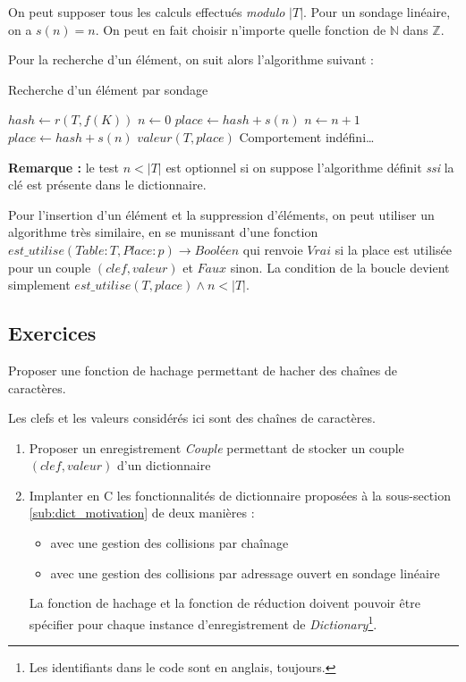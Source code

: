 \documentclass[../../../main.tex]{subfiles}
\begin{document}
On peut supposer tous les calculs effectués \textit{modulo} $|T|$. Pour un sondage linéaire, on a $s(n) = n$. On peut en fait choisir n'importe quelle fonction de $\mathbb{N}$ dans $\mathbb{Z}$.

Pour la recherche d'un élément, on suit alors l'algorithme suivant :\newline

\begin{algorithm}
\caption{Recherche d'un élément par sondage}\label{alg:dict_sondage}
$hash \leftarrow r(T, f(K))$\;
$n \leftarrow 0$\;
$place \leftarrow hash + s(n)$\;
 {
	$n\leftarrow n + 1$\;
	$place\leftarrow hash + s(n)$\;
}
 {
	\Return $valeur(T, place)$\;
} {
	Comportement indéfini\dots {}
}
\end{algorithm}

\textbf{Remarque :} le test $n < |T|$ est optionnel si on suppose l'algorithme définit \textit{ssi} la clé est présente dans le dictionnaire.

Pour l'insertion d'un élément et la suppression d'éléments, on peut utiliser un algorithme très similaire, en se munissant d'une fonction $est\_utilise(Table:T, Place:p)\rightarrow \textit{Booléen}$ qui renvoie $Vrai$ si la place est utilisée pour un couple $(clef, valeur)$ et $Faux$ sinon. La condition de la boucle devient simplement $est\_utilise(T, place) \wedge n < |T|$.
\subsection{Exercices}
Proposer une fonction de hachage permettant de hacher des chaînes de caractères.

Les clefs et les valeurs considérés ici sont des chaînes de caractères.
\begin{enumerate}
	\item Proposer un enregistrement \textit{Couple} permettant de stocker un couple $(clef, valeur)$ d'un dictionnaire
	\item Implanter en C les fonctionnalités de dictionnaire proposées à la sous-section \ref{sub:dict_motivation} de deux manières :
		\begin{itemize}
			\item avec une gestion des collisions par chaînage
			\item avec une gestion des collisions par adressage ouvert en sondage linéaire
		\end{itemize}
		La fonction de hachage et la fonction de réduction doivent pouvoir être spécifier pour chaque instance d'enregistrement de \textit{Dictionary}\footnote{Les identifiants dans le code sont en anglais, toujours.}.
\end{enumerate}
\end{document}
